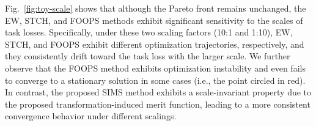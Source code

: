 \documentclass[sigconf]{acmart}
\begin{document}
Fig.~\ref{fig:toy-scale} shows that although the Pareto front remains unchanged, the EW, STCH, and FOOPS methods exhibit significant sensitivity to the scales of task losses. Specifically, under these two scaling factors (10:1 and 1:10), EW, STCH, and FOOPS exhibit different optimization trajectories, respectively, and they consistently drift toward the task loss with the larger scale. %
We further observe that the FOOPS method exhibits optimization instability and even fails to converge to a stationary solution in some cases (i.e., the point circled in red). %
In contrast, %
the proposed SIMS method exhibits a scale-invariant property due to the proposed transformation-induced merit function, %
leading to a more consistent convergence behavior under different scalings.  %
\end{document}
